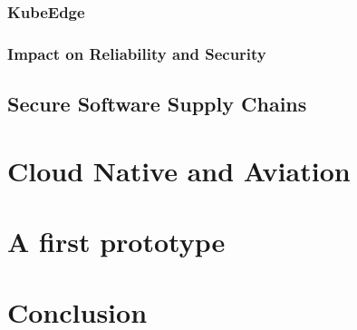 \documentclass[titlepage]{report}
\begin{document}
\subsection{KubeEdge}
\subsection{Impact on Reliability and Security}
\section{Secure Software Supply Chains}
\chapter{Cloud Native and Aviation}
\chapter{A first prototype}
\chapter{Conclusion}

\nocite{*}
\printbibliography{}
\lstlistoflistings{}
\listoftables{}
\listoffigures
\glsaddallunused
\printglossary{}
\end{document}
